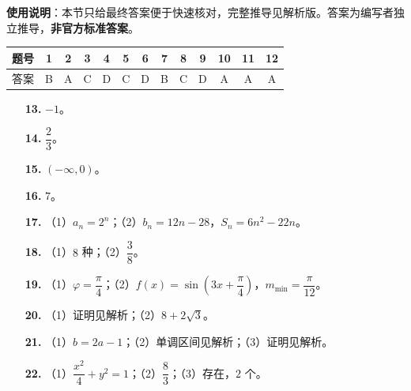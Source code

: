
\begin{gknotice}
\textbf{使用说明}：本节只给最终答案便于快速核对，完整推导见解析版。答案为编写者独立推导，\textbf{非官方标准答案}。
\end{gknotice}

\begin{center}\begin{tabular}{ccccccccccccc}
\toprule
题号 & 1 & 2 & 3 & 4 & 5 & 6 & 7 & 8 & 9 & 10 & 11 & 12 \\
\midrule
答案 & B & A & C & D & C & D & B & C & D & A & A & A \\
\bottomrule
\end{tabular}\end{center}

\begin{itemize}[leftmargin=2.6em]
  \item[\textbf{13.}] $-1$。
  \item[\textbf{14.}] $\dfrac23$。
  \item[\textbf{15.}] $(-\infty,0)$。
  \item[\textbf{16.}] $7$。
\end{itemize}

\begin{itemize}[leftmargin=2.6em]
  \item[\textbf{17.}] （1）$a_n=2^n$；（2）$b_n=12n-28$，$S_n=6n^2-22n$。
  \item[\textbf{18.}] （1）$8$ 种；（2）$\dfrac38$。
  \item[\textbf{19.}] （1）$\varphi=\dfrac\pi4$；（2）$f(x)=\sin\left(3x+\dfrac\pi4\right)$，$m_{\min}=\dfrac\pi{12}$。
  \item[\textbf{20.}] （1）证明见解析；（2）$8+2\sqrt3$。
  \item[\textbf{21.}] （1）$b=2a-1$；（2）单调区间见解析；（3）证明见解析。
  \item[\textbf{22.}] （1）$\dfrac{x^2}4+y^2=1$；（2）$\dfrac83$；（3）存在，$2$ 个。
\end{itemize}
